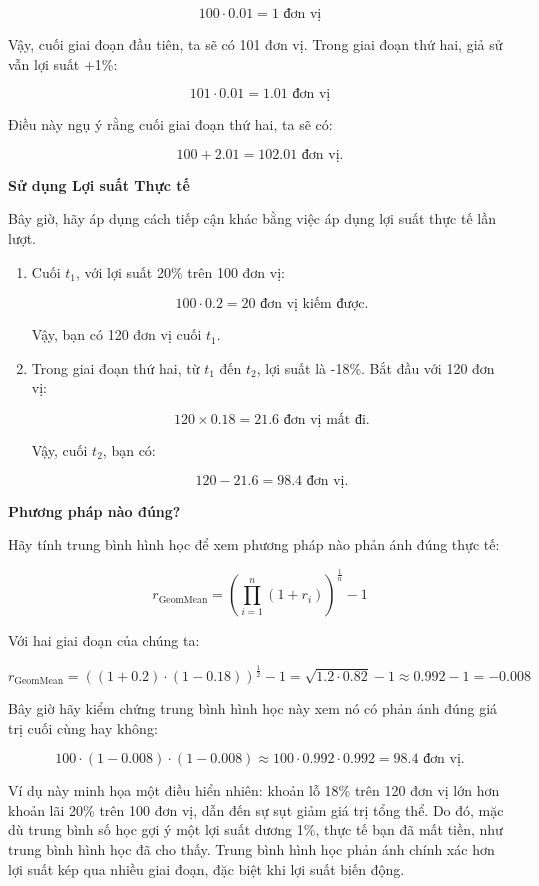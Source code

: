 $$
100 \cdot 0.01 = 1 \text{ đơn vị}
$$

Vậy, cuối giai đoạn đầu tiên, ta sẽ có 101 đơn vị. Trong giai đoạn thứ hai, giả sử vẫn lợi suất +1\%:

$$
101 \cdot 0.01 = 1.01 \text{ đơn vị}
$$

Điều này ngụ ý rằng cuối giai đoạn thứ hai, ta sẽ có:

$$
100 + 2.01 = 102.01 \text{ đơn vị.}
$$

\textbf{Sử dụng Lợi suất Thực tế}

Bây giờ, hãy áp dụng cách tiếp cận khác bằng việc áp dụng lợi suất thực tế lần lượt.

\begin{enumerate}
  \item Cuối $t_{1}$, với lợi suất 20\% trên 100 đơn vị:

$$
100 \cdot 0.2 = 20 \text{ đơn vị kiếm được.}
$$

  Vậy, bạn có 120 đơn vị cuối $t_{1}$.

  \item Trong giai đoạn thứ hai, từ $t_{1}$ đến $t_{2}$, lợi suất là -18\%. Bắt đầu với 120 đơn vị:

$$
120 \times 0.18 = 21.6 \text{ đơn vị mất đi.}
$$

  Vậy, cuối $t_{2}$, bạn có:

$$
120 - 21.6 = 98.4 \text{ đơn vị.}
$$
\end{enumerate}

\textbf{Phương pháp nào đúng?}

Hãy tính trung bình hình học để xem phương pháp nào phản ánh đúng thực tế:

$$
r_{\text{GeomMean}} = \left(\prod _{i=1}^{n} (1 + r_{i}) \right)^{\frac {1}{n}} - 1
$$

Với hai giai đoạn của chúng ta:

$$
r_{\text{GeomMean}} = \left( (1 + 0.2) \cdot (1 - 0.18) \right)^{\frac{1}{2}} - 1 = \sqrt{1.2 \cdot 0.82} - 1 \approx 0.992 - 1 = -0.008
$$

Bây giờ hãy kiểm chứng trung bình hình học này xem nó có phản ánh đúng giá trị cuối cùng hay không:

$$
100 \cdot (1 - 0.008) \cdot (1 - 0.008) \approx 100 \cdot 0.992 \cdot 0.992 = 98.4 \text{ đơn vị.}
$$

Ví dụ này minh họa một điều hiển nhiên: khoản lỗ 18\% trên 120 đơn vị lớn hơn khoản lãi 20\% trên 100 đơn vị, dẫn đến sự sụt giảm giá trị tổng thể. Do đó, mặc dù trung bình số học gợi ý một lợi suất dương 1\%, thực tế bạn đã mất tiền, như trung bình hình học đã cho thấy. Trung bình hình học phản ánh chính xác hơn lợi suất kép qua nhiều giai đoạn, đặc biệt khi lợi suất biến động.

